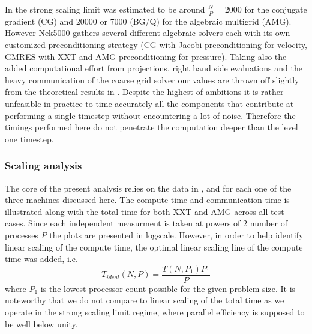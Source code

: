 \documentclass{sig-alternate}
\begin{document}
In \cite{fischer:scaling} the strong scaling limit  was estimated to be around $\frac{N}{P}=2000$ for the conjugate gradient (CG) and $20000$ or $7000$ (BG/Q) for the algebraic multigrid (AMG). However Nek5000 gathers several different algebraic solvers each with its own customized preconditioning strategy (CG with Jacobi preconditioning for velocity, GMRES with XXT and AMG preconditioning for pressure). 
Taking also the added computational effort from projections, right hand side evaluations and the heavy communication of the coarse grid solver our values are thrown off slightly from the theoretical results in \cite{fischer:scaling}. Despite the highest of ambitions it is rather unfeasible in practice to time accurately all the components that contribute at performing a single timestep without encountering a lot of noise.  Therefore the timings performed here do not penetrate the computation deeper than the level one timestep.

\subsubsection*{Scaling analysis}

The core of the present analysis relies on the data in ,  and  for each one of the three machines discussed here. 
The compute time and
communication time is illustrated along with the total time for both XXT and AMG across all test cases. 
Since each independent measurment is taken at powers of $2$ number of processes $P$ the plots are presented in logscale. However, in order to help identify linear scaling of the
compute time, the optimal linear scaling line of the compute time was added, i.e.
$$
T_{ideal}(N,P)=\frac{T(N,P_1)P_1}{P}
$$
where $P_1$ is the lowest processor count possible for the given problem size. It is noteworthy that we do not compare to linear scaling of the total time as we operate in the strong scaling limit regime, where parallel efficiency is supposed to be well below unity.
\end{document}
